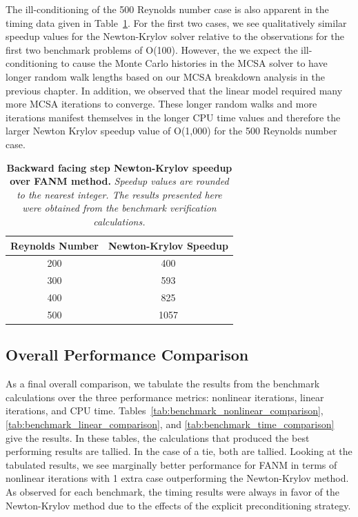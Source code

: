 The ill-conditioning of the 500 Reynolds number case is also apparent
in the timing data given in
Table~\ref{tab:step_speedup_comparison}. For the first two cases, we
see qualitatively similar speedup values for the Newton-Krylov solver
relative to the observations for the first two benchmark problems of
O(100). However, the we expect the ill-conditioning to cause the Monte
Carlo histories in the MCSA solver to have longer random walk lengths
based on our MCSA breakdown analysis in the previous chapter. In
addition, we observed that the linear model required many more MCSA
iterations to converge. These longer random walks and more iterations
manifest themselves in the longer CPU time values and therefore the
larger Newton Krylov speedup value of O(1,000) for the 500 Reynolds
number case.

\begin{table}[h!]
  \begin{center}
    \begin{tabular}{cc}\hline\hline
      \multicolumn{1}{c}{Reynolds Number}& 
      \multicolumn{1}{c}{Newton-Krylov Speedup}\\
      \hline
      200 & 400 \\
      300 & 593 \\
      400 & 825 \\
      500 & 1057 \\
      \hline\hline
    \end{tabular}
  \end{center}
  \caption{\textbf{Backward facing step Newton-Krylov speedup
      over FANM method.} \textit{Speedup values are rounded to the
      nearest integer. The results presented here were obtained from
      the benchmark verification calculations.}}
  \label{tab:step_speedup_comparison}
\end{table}

\clearpage

\subsection{Overall Performance Comparison}
\label{subsec:nonlinear_overall_comparison}

As a final overall comparison, we tabulate the results from the
benchmark calculations over the three performance metrics: nonlinear
iterations, linear iterations, and CPU
time. Tables~\ref{tab:benchmark_nonlinear_comparison},
\ref{tab:benchmark_linear_comparison}, and
\ref{tab:benchmark_time_comparison} give the results. In these tables,
the calculations that produced the best performing results are
tallied. In the case of a tie, both are tallied. Looking at the
tabulated results, we see marginally better performance for FANM in
terms of nonlinear iterations with 1 extra case outperforming the
Newton-Krylov method. As observed for each benchmark, the timing
results were always in favor of the Newton-Krylov method due to the
effects of the explicit preconditioning strategy.

